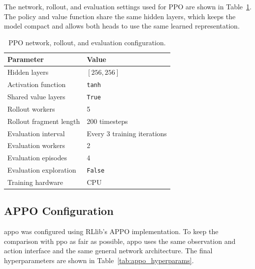 \documentclass[english,bachelor]{hsluthesis}
\begin{document}
The network, rollout, and evaluation settings used for PPO are shown in Table~\ref{tab:ppo_runtime_config}. The policy and value function share the same hidden layers, which keeps the model compact and allows both heads to use the same learned representation.

\begin{table}[H]
\centering
\begin{tabular}{l l}
\hline
Parameter & Value \\
\hline
Hidden layers & $[256, 256]$ \\
Activation function & \texttt{tanh} \\
Shared value layers & \texttt{True} \\
Rollout workers & 5 \\
Rollout fragment length & 200 timesteps \\
Evaluation interval & Every 3 training iterations \\
Evaluation workers & 2 \\
Evaluation episodes & 4 \\
Evaluation exploration & \texttt{False} \\
Training hardware & CPU \\
\hline
\end{tabular}
\caption{PPO network, rollout, and evaluation configuration.}
\label{tab:ppo_runtime_config}
\end{table}

\subsection{APPO Configuration}

\gls{appo} was configured using RLlib's APPO implementation. To keep the comparison with \gls{ppo} as fair as possible, \gls{appo} uses the same observation and action interface and the same general network architecture. The final hyperparameters are shown in Table~\ref{tab:appo_hyperparams}.
\end{document}
